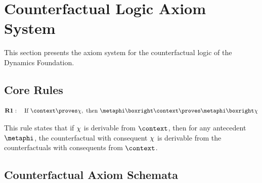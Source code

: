 \documentclass[../LogosReference.tex]{subfiles}
\begin{document}

\section{Counterfactual Logic Axiom System}\label{sec:core-axioms}

This section presents the axiom system for the counterfactual logic of the Dynamics Foundation.


\subsection{Core Rules}\label{sec:core-rules}

\begin{definition}\label{def:closure-deduction}
	\[
		\textbf{R1}: \quad \text{If } \context \proves \metaC, \text{ then } \metaphi \boxright \context \proves \metaphi \boxright \metaC
	\]
\end{definition}

\begin{remark}
	This rule states that if $\chi$ is derivable from $\context$, then for any antecedent $\metaphi$, the counterfactual with consequent $\chi$ is derivable from the counterfactuals with consequents from $\context$.
\end{remark}


\subsection{Counterfactual Axiom Schemata}\label{sec:counterfactual-axioms}
\end{document}
